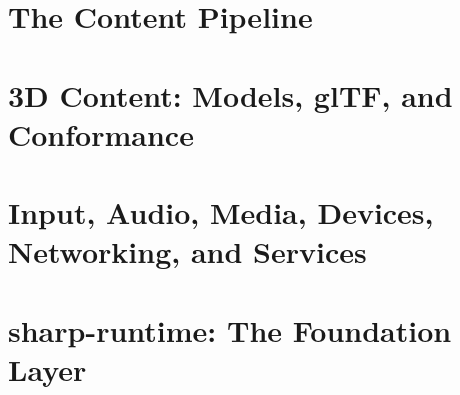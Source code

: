 \documentclass[11pt,twoside,openright]{book}
\begin{document}
\part{The Content Pipeline}
\label{part:content-pipeline}






\part{3D Content: Models, glTF, and Conformance}
\label{part:3d-content}







\part{Input, Audio, Media, Devices, Networking, and Services}
\label{part:services}










\part{sharp-runtime: The Foundation Layer}
\label{part:sharp-runtime}






\end{document}
